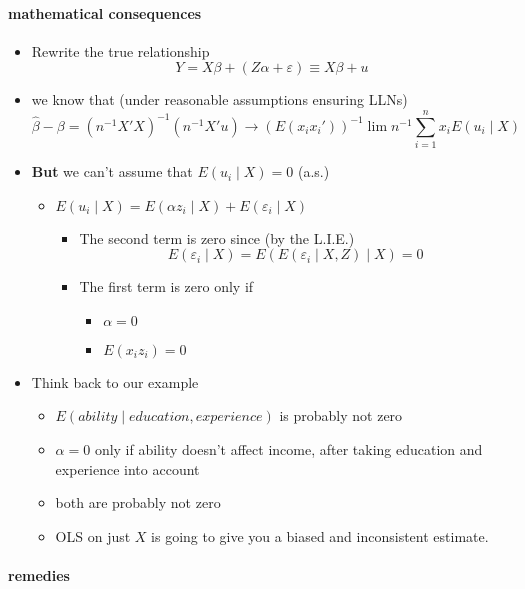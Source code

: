 \paragraph{mathematical consequences}
\begin{itemize}
\item Rewrite the true relationship
         \[ Y = X\beta + (Z\alpha + \varepsilon) \equiv X\beta + u \]
\item we know that (under reasonable assumptions ensuring LLNs)
         \[\hat{\beta} - \beta = (n^{-1} X'X)^{-1}(n^{-1} X'u) \to
         (E(x_{i}x_{i}'))^{-1} \lim n^{-1} \sum_{i=1}^{n} x_{i}
         E(u_{i} \mid X)\]
\item \textbf{But} we can't assume that $E(u_{i}\mid X) = 0$ (a.s.)
\begin{itemize}
\item $E(u_{i} \mid X) = E(\alpha z_{i} \mid X) +
           E(\varepsilon_{i} \mid X)$
\begin{itemize}
\item The second term is zero since (by the
             L.I.E.) \[E(\varepsilon_{i} \mid X) =
             E(E(\varepsilon_{i}\mid X, Z) \mid X) = 0\]
\item The first term is zero only if
\begin{itemize}
\item $\alpha = 0$
\item $E(x_{i} z_{i}) = 0$
\end{itemize}
\end{itemize}
\end{itemize}
\item Think back to our example
\begin{itemize}
\item $E(ability \mid education, experience)$ is probably not zero
\item $\alpha = 0$ only if ability doesn't affect income, after
           taking education and experience into account
\item both are probably not zero
\item OLS on just $X$ is going to give you a biased and
           inconsistent estimate.
\end{itemize}
\end{itemize}

\paragraph{remedies}

